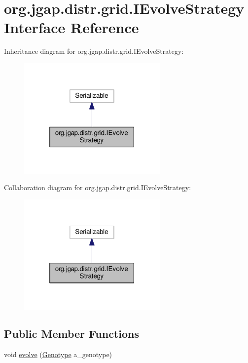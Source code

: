 \hypertarget{interfaceorg_1_1jgap_1_1distr_1_1grid_1_1_i_evolve_strategy}{\section{org.\-jgap.\-distr.\-grid.\-I\-Evolve\-Strategy Interface Reference}
\label{interfaceorg_1_1jgap_1_1distr_1_1grid_1_1_i_evolve_strategy}
}


Inheritance diagram for org.\-jgap.\-distr.\-grid.\-I\-Evolve\-Strategy\-:
\nopagebreak
\begin{figure}[H]
\begin{center}
\leavevmode
\includegraphics[width=208pt]{interfaceorg_1_1jgap_1_1distr_1_1grid_1_1_i_evolve_strategy__inherit__graph}
\end{center}
\end{figure}


Collaboration diagram for org.\-jgap.\-distr.\-grid.\-I\-Evolve\-Strategy\-:
\nopagebreak
\begin{figure}[H]
\begin{center}
\leavevmode
\includegraphics[width=208pt]{interfaceorg_1_1jgap_1_1distr_1_1grid_1_1_i_evolve_strategy__coll__graph}
\end{center}
\end{figure}
\subsection*{Public Member Functions}
\begin{DoxyCompactItemize}
\item 
void \hyperlink{interfaceorg_1_1jgap_1_1distr_1_1grid_1_1_i_evolve_strategy_a8786d3fd6987f5ff7a11b4f235d58f87}{evolve} (\hyperlink{classorg_1_1jgap_1_1_genotype}{Genotype} a\-\_\-genotype)
\end{DoxyCompactItemize}
